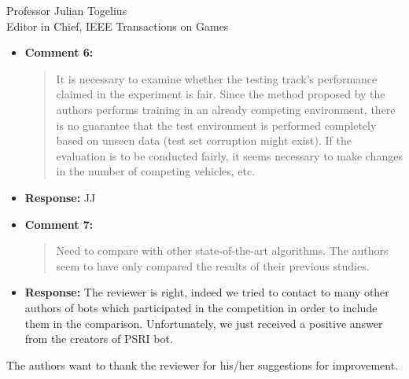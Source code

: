 \documentclass[10pt]{letter} %
\begin{document}
\begin{letter}{Professor Julian Togelius \\ Editor in Chief, IEEE Transactions on Games}
\begin{enumerate}
\begin{itemize}
		\item {\bf Comment 6:}
		\begin{quote}
It is necessary to examine whether the testing track's performance claimed in the experiment is fair. Since the method proposed by the authors performs training in an already competing environment, there is no guarantee that the test environment is performed completely based on unseen data (test set corruption might exist). If the evaluation is to be conducted fairly, it seems necessary to make changes in the number of competing vehicles, etc.
			\end{quote}	
		\item {\bf Response:} 
		JJ
		\item {\bf Comment 7:}
		\begin{quote}
Need to compare with other state-of-the-art algorithms. The authors seem to have only compared the results of their previous studies.				
			\end{quote}	
		\item {\bf Response:} 
		The reviewer is right, indeed we tried to contact to many other authors of bots which participated in the competition in order to include them in the comparison. Unfortunately, we just received a positive answer
		from the creators of PSRI bot.
		
	\end{itemize}					

The authors want to thank the reviewer for his/her suggestions for improvement.


\end{enumerate}
 


\end{letter}
\end{document}

